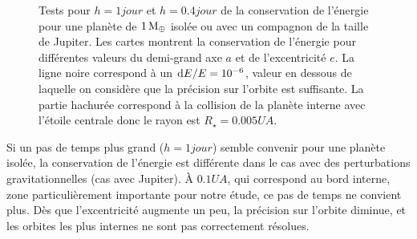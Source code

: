\begin{figure}[htbp]
\centering
{}\hfill
{}

\hfill
{}


\caption[Conservation de l'énergie en fonction du pas de temps et des conditions initiales.]{Tests pour $h=1\unit{jour}$ et
$h=0.4\unit{jour}$ de la conservation de l'énergie pour une planète de $1\mathrm{\thinspace M_\oplus}$ isolée ou avec un compagnon de la taille de
Jupiter. Les cartes montrent la conservation de l'énergie pour différentes valeurs du demi-grand axe $a$ et de l'excentricité
$e$. La ligne noire correspond à un $\operatorname{d \!} E/E=10^{-6}$, valeur en dessous de laquelle on considère que la précision sur l'orbite
est suffisante. La partie hachurée correspond à la collision de la planète interne avec l'étoile centrale donc le rayon est
$R_\star=0.005\unit{UA}$.}\label{fig:accuracy_maps}
\end{figure}

Si un pas de temps plus grand ($h=1\unit{jour}$) semble convenir pour une planète isolée, la conservation de l'énergie est différente dans le cas avec des perturbations gravitationnelles (cas avec Jupiter). À $0.1\unit{UA}$, qui correspond au bord interne, zone particulièrement importante pour notre étude, ce pas de temps ne convient plus. Dès que l'excentricité augmente un peu, la précision sur l'orbite diminue, et les orbites les plus internes  ne sont pas correctement résolues.

